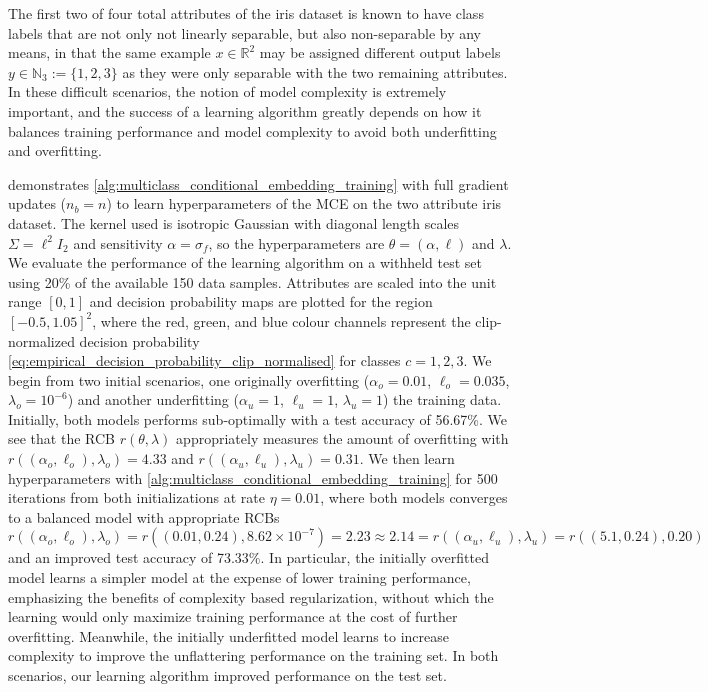 \documentclass[twoside]{article}
\begin{document}
		The first two of four total attributes of the iris dataset \citep{fisher1936use} is known to have class labels that are not only not linearly separable, but also non-separable by any means, in that the same example $x \in \mathbb{R}^{2}$ may be assigned different output labels $y \in \mathbb{N}_{3} := \{1, 2, 3\}$ as they were only separable with the two remaining attributes. In these difficult scenarios, the notion of model complexity is extremely important, and the success of a learning algorithm greatly depends on how it balances training performance and model complexity to avoid both underfitting and overfitting. 
		
		 demonstrates \cref{alg:multiclass_conditional_embedding_training} with full gradient updates ($n_{b} = n$) to learn hyperparameters of the \gls{MCE} on the two attribute iris dataset. The kernel used is isotropic Gaussian with diagonal length scales $\Sigma = \ell^{2} I_{2}$ and sensitivity $\alpha = \sigma_{f}$, so the hyperparameters are $\theta = (\alpha, \ell)$ and $\lambda$. We evaluate the performance of the learning algorithm on a withheld test set using 20\% of the available 150 data samples. Attributes are scaled into the unit range $[0, 1]$ and decision probability maps are plotted for the region $[-0.5, 1.05]^{2}$, where the red, green, and blue colour channels represent the clip-normalized decision probability \eqref{eq:empirical_decision_probability_clip_normalised} for classes $c = 1, 2, 3$. We begin from two initial scenarios, one originally overfitting ($\alpha_{o} = 0.01$, $\ell_{o} = 0.035$, $\lambda_{o} = 10^{-6}$) and another underfitting ($\alpha_{u} = 1$, $\ell_{u} = 1$, $\lambda_{u} = 1$) the training data. Initially, both models performs sub-optimally with a test accuracy of 56.67\%. We see that the \gls{RCB} $r(\theta, \lambda)$ appropriately measures the amount of overfitting with $r((\alpha_{o}, \ell_{o}), \lambda_{o}) = 4.33$ and $r((\alpha_{u}, \ell_{u}), \lambda_{u}) = 0.31$. We then learn hyperparameters with \cref{alg:multiclass_conditional_embedding_training} for 500 iterations from both initializations at rate $\eta = 0.01$, where both models converges to a balanced model with appropriate \glspl{RCB} $r((\alpha_{o}, \ell_{o}), \lambda_{o}) = r((0.01, 0.24), 8.62 \times 10^{-7}) = 2.23 \approx 2.14 = r((\alpha_{u}, \ell_{u}), \lambda_{u}) = r((5.1, 0.24), 0.20)$ and an improved test accuracy of 73.33\%. In particular, the initially overfitted model learns a simpler model at the expense of lower training performance, emphasizing the benefits of complexity based regularization, without which the learning would only maximize training performance at the cost of further overfitting. Meanwhile, the initially underfitted model learns to increase complexity to improve the unflattering performance on the training set. In both scenarios, our learning algorithm improved performance on the test set.
	
\end{document}
